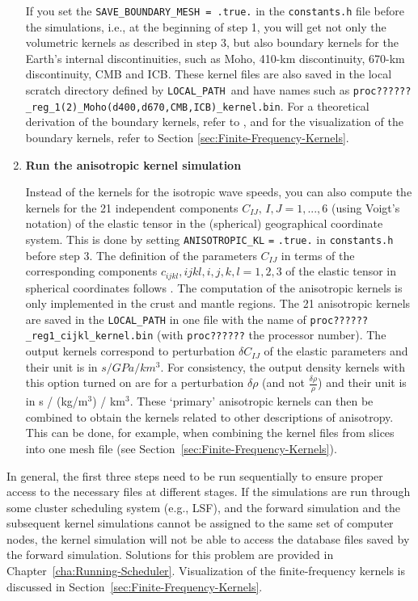\documentclass[oneside,english]{book}
\begin{document}
\begin{enumerate}
\noindent If you set the \texttt{SAVE\_BOUNDARY\_MESH = .true.} in
the \texttt{constants.h} file before the simulations, i.e., at the
beginning of step 1, you will get not only the volumetric kernels
as described in step 3, but also boundary kernels for the Earth's
internal discontinuities, such as Moho, 410-km discontinuity, 670-km
discontinuity, CMB and ICB. These kernel files are also saved in the
local scratch directory defined by \texttt{LOCAL\_PATH }and have names
such as \texttt{proc??????\_reg\_1(2)\_Moho(d400,d670,CMB,ICB)\_kernel.bin}.
For a theoretical derivation of the boundary kernels, refer to \citet{TrTaLi05},
and for the visualization of the boundary kernels, refer to Section
\ref{sec:Finite-Frequency-Kernels}.

\item \textbf{Run the anisotropic kernel simulation}


Instead of the kernels for the isotropic wave speeds, you can also
compute the kernels for the 21 independent components $C_{IJ},\, I,J=1,...,6$
(using Voigt's notation) of the elastic tensor in the (spherical)
geographical coordinate system. This is done by setting \texttt{ANISOTROPIC\_KL}
\texttt{=} \texttt{.true.} in \texttt{constants.h} before step 3.
The definition of the parameters $C_{IJ}$ in terms of the corresponding
components $c_{ijkl},ijkl,i,j,k,l=1,2,3$ of the elastic tensor in
spherical coordinates follows \citet{ChTr07}. The computation of
the anisotropic kernels is only implemented in the crust and mantle
regions. The 21 anisotropic kernels are saved in the \texttt{LOCAL\_PATH}
in one file with the name of \texttt{proc??????\_reg1\_cijkl\_kernel.bin}
(with \texttt{proc??????} the processor number). The output kernels
correspond to perturbation $\delta C_{IJ}$ of the elastic parameters
and their unit is in $s/GPa/km^{3}$. For consistency, the output
density kernels with this option turned on are for a perturbation
$\delta\rho$ (and not $\frac{\delta\rho}{\rho}$) and their unit
is in s / (kg/m$^{3}$) / km$^{3}$. These `primary' anisotropic kernels
can then be combined to obtain the kernels related to other descriptions
of anisotropy. This can be done, for example, when combining the kernel
files from slices into one mesh file (see Section~\ref{sec:Finite-Frequency-Kernels}).

\end{enumerate}
In general, the first three steps need to be run sequentially to ensure
proper access to the necessary files at different stages. If the simulations
are run through some cluster scheduling system (e.g., LSF), and the
forward simulation and the subsequent kernel simulations cannot be
assigned to the same set of computer nodes, the kernel simulation
will not be able to access the database files saved by the forward
simulation. Solutions for this problem are provided in Chapter~\ref{cha:Running-Scheduler}.
Visualization of the finite-frequency kernels is discussed in Section~\ref{sec:Finite-Frequency-Kernels}.
\end{document}
